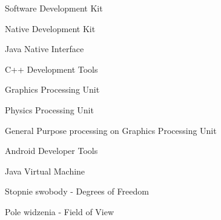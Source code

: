 \suppressfloats[t]

\begin{description}[\setleftmargin{65pt}\setlabelstyle{\bfseries}]
    \leftskip=1cm

	\item[$SDK$]      	Software Development Kit
    \item[$NDK$]      	Native Development Kit
    \item[$JNI$]      	Java Native Interface
    \item[$CDT$]        C++ Development Tools
    \item[$GPU$]		Graphics Processing Unit
    \item[$PPU$]        Physics Processing Unit
    \item[$GPGPU$]      General Purpose processing on Graphics Processing Unit
    \item[$ADT$]        Android Developer Tools
    \item[$JVM$]        Java Virtual Machine
    \item[$DoF$]        Stopnie swobody - Degrees of Freedom
    \item[$FoV$]		Pole widzenia - Field of View
\end{description}
